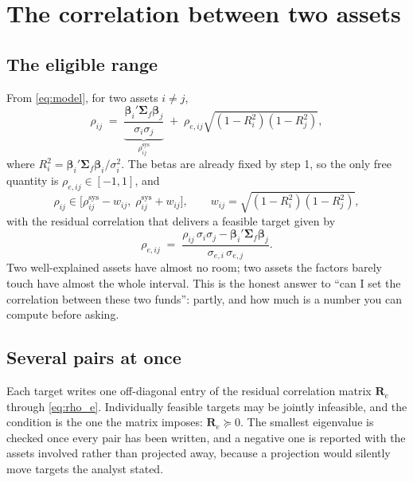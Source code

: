 \documentclass[11pt]{article}
\newcommand{\bbeta}{\boldsymbol\beta}
\newcommand{\bSigma}{\boldsymbol\Sigma}
\newcommand{\bR}{\mathbf R}
\begin{document}
\section{The correlation between two assets}

\subsection{The eligible range}

From \eqref{eq:model}, for two assets $i \ne j$,
\begin{equation}\label{eq:pair}
  \rho_{ij} \;=\; \underbrace{\frac{\bbeta_i' \bSigma_f \bbeta_j}{\sigma_i \sigma_j}}_{\rho^{\text{sys}}_{ij}}
   \;+\; \rho_{e,ij}\sqrt{(1 - R_i^2)(1 - R_j^2)} ,
\end{equation}
where $R_i^2 = \bbeta_i'\bSigma_f\bbeta_i / \sigma_i^2$. The betas are already
fixed by step 1, so the only free quantity is $\rho_{e,ij} \in [-1, 1]$, and
\begin{equation}\label{eq:range}
  \rho_{ij} \in \Big[\rho^{\text{sys}}_{ij} - w_{ij},\;
                     \rho^{\text{sys}}_{ij} + w_{ij}\Big], \qquad
  w_{ij} = \sqrt{(1 - R_i^2)(1 - R_j^2)} ,
\end{equation}
with the residual correlation that delivers a feasible target given by
\begin{equation}\label{eq:rho_e}
  \rho_{e,ij} \;=\; \frac{\rho_{ij}\,\sigma_i\sigma_j - \bbeta_i'\bSigma_f\bbeta_j}
                         {\sigma_{e,i}\,\sigma_{e,j}} .
\end{equation}
Two well-explained assets have almost no room; two assets the factors barely
touch have almost the whole interval. This is the honest answer to ``can I set
the correlation between these two funds'': partly, and how much is a number you
can compute before asking.

\subsection{Several pairs at once}

Each target writes one off-diagonal entry of the residual correlation matrix
$\bR_e$ through \eqref{eq:rho_e}. Individually feasible targets may be jointly
infeasible, and the condition is the one the matrix imposes: $\bR_e \succeq 0$.
The smallest eigenvalue is checked once every pair has been written, and a
negative one is reported with the assets involved rather than projected away,
because a projection would silently move targets the analyst stated.
\end{document}

